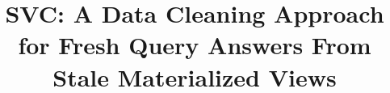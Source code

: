 \documentclass{sig-alternate}
\begin{document}
\setlength{\belowdisplayskip}{2pt} \setlength{\belowdisplayshortskip}{2pt}
\setlength{\abovedisplayskip}{2pt} \setlength{\abovedisplayshortskip}{2pt}
\setlength{\belowcaptionskip}{-8pt}
\selectfont

\newtheorem{theorem}{Theorem}
\newtheorem{example}{Example}
\newtheorem{definition}{Definition}
\newtheorem{proposition}{Proposition}
\newtheorem{lemma}{Lemma}
\newtheorem{corollary}{Corollary}

\newcommand{\cond}{\textrm{Cond}\xspace}
\newcommand{\dataset}{data set\xspace}
\newcommand{\datasets}{data sets\xspace}
\newcommand{\spview}{\textsf{SPView}\xspace}
\newcommand{\fjview}{\textsf{FJView}\xspace}
\newcommand{\aggview}{\textsf{AggView}\xspace}
\newcommand{\hashfunc}[1]{\textsf{hashfunc}(#1)\xspace}

\newcommand{\avgfunc}{\ensuremath{\texttt{avg} }\xspace}
\newcommand{\maxfunc}{\ensuremath{\texttt{max} }\xspace}
\newcommand{\countfunc}{\ensuremath{\texttt{count}}\xspace}
\newcommand{\sumfunc}{\ensuremath{\texttt{sum} }\xspace}
\newcommand{\havingfunc}{\ensuremath{\texttt{HAVING} }\xspace}
\newcommand{\ratio}{\ensuremath{\rho }\xspace}


\newcommand{\insertion}{\ensuremath{\texttt{INSERT} }\xspace}
\newcommand{\update}{\ensuremath{\texttt{UPDATE} }\xspace}
\newcommand{\delete}{\ensuremath{\texttt{DELETE} }\xspace}


\newcommand{\tbl}[1]{\textsf{#1}\xspace}
\newcommand{\field}[1]{\textsf{#1}\xspace}
\newcommand{\cost}{\textrm{cost}\xspace}
\newcommand{\ans}{\textsf{ans}\xspace}
\newcommand{\dans}{\Delta\textsf{ans}\xspace}
\newcommand{\cqp}{correction query processing\xspace}
\newcommand{\Cqp}{Correction query processing\xspace}

\newcommand{\reminder}[1]{{{\textcolor{magenta}{\{\{\bf #1\}\}}}\xspace}}
\newcommand{\specialcell}[2][c]{%
  \begin{tabular}[#1]{@{}c@{}}#2\end{tabular}}

\pagestyle{plain}

\title{SVC: A Data Cleaning Approach for Fresh Query Answers From Stale Materialized Views}
\end{document}
